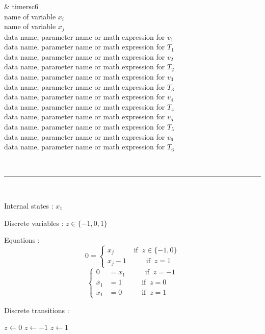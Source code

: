 \parbox[t]{100mm}{\sf 
\& timersc6\\
name of variable $x_i$\\
name of variable $x_j$\\
data name, parameter name or math expression for $v_1$\\
data name, parameter name or math expression for $T_1$\\
data name, parameter name or math expression for $v_2$\\
data name, parameter name or math expression for $T_2$\\
data name, parameter name or math expression for $v_3$\\
data name, parameter name or math expression for $T_3$\\
data name, parameter name or math expression for $v_4$\\
data name, parameter name or math expression for $T_4$\\
data name, parameter name or math expression for $v_5$\\
data name, parameter name or math expression for $T_5$\\
data name, parameter name or math expression for $v_6$\\
data name, parameter name or math expression for $T_6$
}

~ \hrule ~

Internal states : $x_1$

Discrete variables : $z \in \{-1,0,1\}$

Equations :
\begin{equation*}
0 =
\begin{cases}
x_j \;\;\;\;\;\;\;\;\;\; \mbox{if} \;\; z \in \{-1,0 \} \\
x_j-1 \;\;\;\;\;\;\;\;\;\; \mbox{if} \;\; z = 1
\end{cases} 
\end{equation*}
\begin{equation*}
\begin{cases}
0 & = x_1 \;\;\;\;\;\;\;\;\;\; \mbox{if} \;\; z = -1 \\
\dot{x_1} & =  1 \;\;\;\;\;\;\;\;\;\; \mbox{if} \;\; z = 0 \\
\dot{x_1} & =  0 \;\;\;\;\;\;\;\;\;\; \mbox{if} \;\; z = 1
\end{cases}
\end{equation*}

Discrete transitions : 

\hspace*{20ex}\begin{minipage}[t]{6cm}
\begin{algorithmic} 
    \STATE $z \gets 0$
  \ENDIF
\ELSE
     \STATE $z \gets -1$
  \ENDIF
\ENDIF
{}
    \STATE $z \gets 1$
  \ENDIF
\ENDIF
\end{algorithmic}
\end{minipage}


